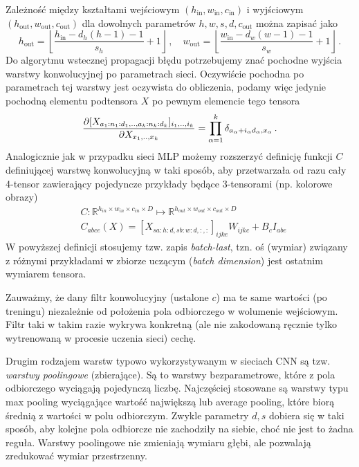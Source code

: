\documentclass{myclass}
\begin{document}
Zależność między kształtami wejściowym \((h_\text{in},w_\text{in},c_\text{in})\) i wyjściowym
\((h_\text{out},w_\text{out},c_\text{out})\) dla dowolnych parametrów \(h,w,s,d,c_\text{out}\) można
zapisać jako 
\begin{equation*}
    h_\text{out} = \left\lfloor \frac{h_\text{in} - d_h(h-1) - 1}{s_h} + 1\right\rfloor\,,\quad w_\text{out} = \left\lfloor \frac{w_\text{in} - d_w(w-1) - 1}{s_w} + 1\right\rfloor\,.
\end{equation*}
Do algorytmu wstecznej propagacji błędu potrzebujemy znać pochodne wyjścia warstwy konwolucyjnej po
parametrach sieci. Oczywiście pochodna po parametrach tej warstwy jest oczywista do obliczenia,
podamy więc jedynie pochodną elementu podtensora \(X\) po pewnym elemencie tego tensora
\begin{equation*}
    \pdv{[X_{a_1:n_1:d_1,..,a_k:n_k:d_k}]_{i_1,..,i_k}}{X_{x_1,..,x_k}} = \prod_{\alpha=1}^k \delta_{a_\alpha + i_\alpha d_\alpha, x_\alpha}\,.
\end{equation*}
Analogicznie jak w przypadku sieci MLP możemy rozszerzyć definicję funkcji \(C\) definiującej
warstwę konwolucyjną w taki sposób, aby przetwarzała od razu cały 4-tensor zawierający pojedyncze
przykłady będące 3-tensorami (np. kolorowe obrazy)
\begin{equation*}
    \begin{split}
        &C: \mathbb{R}^{h_{in}\times w_{in}\times c_{in}\times D} \mapsto \mathbb{R}^{h_{out}\times w_{out}\times c_{out}\times D}\\
        &C_{abce}(X) = [X_{sa:h:d,sb:w:d,:,:}]_{ijke}W_{ijkc} + B_c I_{abe}
    \end{split}
\end{equation*}
W powyższej definicji stosujemy tzw. zapis \textit{batch-last}, tzn. oś (wymiar) związany z różnymi
przykładami w zbiorze uczącym (\textit{batch dimension}) jest ostatnim wymiarem tensora.

Zauważmy, że dany filtr konwolucyjny (ustalone \(c\)) ma te same wartości (po treningu) niezależnie
od położenia pola odbiorczego w wolumenie wejściowym. Filtr taki w takim razie wykrywa konkretną
(ale nie zakodowaną ręcznie tylko wytrenowaną w procesie uczenia sieci) cechę.

Drugim rodzajem warstw typowo wykorzystywanym w sieciach CNN są tzw. \textit{warstwy poolingowe}
(zbierające). Są to warstwy bezparametrowe, które z pola odbiorczego wyciągają pojedynczą liczbę.
Najczęściej stosowane są warstwy typu max pooling wyciągające wartość największą lub average
pooling, które biorą średnią z wartości w polu odbiorczym. Zwykle parametry \(d, s\) dobiera się w
taki sposób, aby kolejne pola odbiorcze nie zachodziły na siebie, choć nie jest to żadna reguła.
Warstwy poolingowe nie zmieniają wymiaru głębi, ale pozwalają zredukować wymiar przestrzenny.
\end{document}
